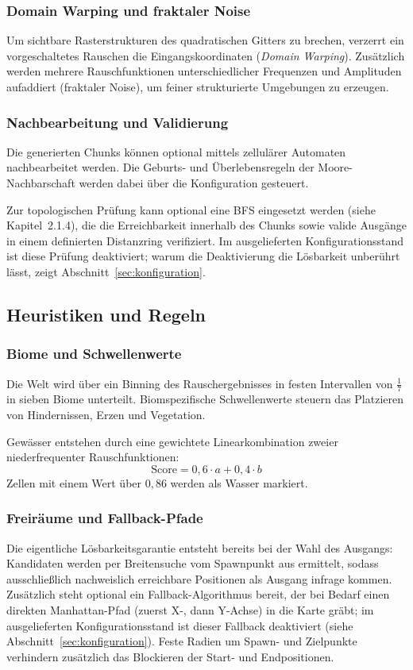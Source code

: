 \documentclass[
  a4paper,
  11pt,
  twoside,
  BCOR=8mm,           %
  headings=big,
  numbers=noenddot,
  listof=totoc,       %
  captions=tableheading,
]{scrreprt}
\begin{document}
\subsubsection{Domain Warping und fraktaler Noise}
Um sichtbare Rasterstrukturen des quadratischen Gitters zu brechen, verzerrt ein vorgeschaltetes Rauschen die Eingangskoordinaten (\textit{Domain Warping}). Zusätzlich werden mehrere Rauschfunktionen unterschiedlicher Frequenzen und Amplituden aufaddiert (fraktaler Noise), um feiner strukturierte Umgebungen zu erzeugen.

\subsubsection{Nachbearbeitung und Validierung}
Die generierten Chunks können optional mittels zellulärer Automaten nachbearbeitet werden. Die Geburts- und Überlebensregeln der Moore-Nachbarschaft werden dabei über die Konfiguration gesteuert.

Zur topologischen Prüfung kann optional eine BFS eingesetzt werden (siehe Kapitel~2.1.4), die die Erreichbarkeit innerhalb des Chunks sowie valide Ausgänge in einem definierten Distanzring verifiziert. Im ausgelieferten Konfigurationsstand ist diese Prüfung deaktiviert; warum die Deaktivierung die Lösbarkeit unberührt lässt, zeigt Abschnitt~\ref{sec:konfiguration}.

\subsection{Heuristiken und Regeln}
\label{sec:heuristiken}

\subsubsection{Biome und Schwellenwerte}
Die Welt wird über ein Binning des Rauschergebnisses in festen Intervallen von $\frac{1}{7}$ in sieben Biome unterteilt. Biomspezifische Schwellenwerte steuern das Platzieren von Hindernissen, Erzen und Vegetation.

Gewässer entstehen durch eine gewichtete Linearkombination zweier niederfrequenter Rauschfunktionen:
\begin{equation}
\text{Score} = 0,6 \cdot a + 0,4 \cdot b
\end{equation}
Zellen mit einem Wert über $0,86$ werden als Wasser markiert.

\subsubsection{Freiräume und Fallback-Pfade}
Die eigentliche Lösbarkeitsgarantie entsteht bereits bei der Wahl des Ausgangs: Kandidaten werden per Breitensuche vom Spawnpunkt aus ermittelt, sodass ausschließlich nachweislich erreichbare Positionen als Ausgang infrage kommen. Zusätzlich steht optional ein Fallback-Algorithmus bereit, der bei Bedarf einen direkten Manhattan-Pfad (zuerst X-, dann Y-Achse) in die Karte gräbt; im ausgelieferten Konfigurationsstand ist dieser Fallback deaktiviert (siehe Abschnitt~\ref{sec:konfiguration}). Feste Radien um Spawn- und Zielpunkte verhindern zusätzlich das Blockieren der Start- und Endpositionen.
\end{document}
